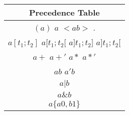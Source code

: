 \begin{tabular}{ |c| }
    \hline
    \textbf{Precedence Table} \\
    \hline
    $(a)$ \quad
    $a$ \quad
    $<ab>$ \quad
    $.$                       \\
    \hline
    $a[t_1;t_2]$ \quad
    $a[t_1;t_2[$ \quad
    $a]t_1;t_2]$ \quad
    $a]t_1;t_2[$              \\
    \hline
    $a+$ \quad
    $a+'$ \quad
    $a*$ \quad
    $a*'$                     \\
    \hline
    $ab$ \quad
    $a'b$                     \\
    \hline
    $a|b$                     \\
    \hline
    $a\&b$                    \\
    \hline
    $a\{a0,b1\}$              \\
    \hline
\end{tabular}